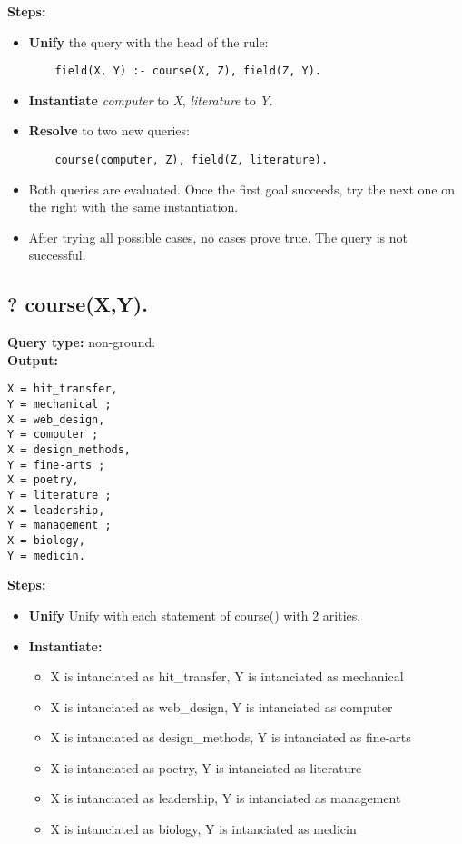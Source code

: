 \textbf{Steps:}
\begin{itemize}
    \item \textbf{Unify} the query with the head of the rule:
    \begin{lstlisting}
    field(X, Y) :- course(X, Z), field(Z, Y).
    \end{lstlisting}
\item \textbf{Instantiate} \textit{computer} to \textit{X}, \textit{literature} to \textit{Y}.
    \item \textbf{Resolve} to two new queries:
    \begin{lstlisting}
    course(computer, Z), field(Z, literature).
    \end{lstlisting}
\item Both queries are evaluated. Once the first goal succeeds, try the next one on the right with the same instantiation.
\item After trying all possible cases, no cases prove true. The query is not successful.
\end{itemize}


\subsection{? course(X,Y).}
\textbf{Query type: } non-ground. \\
\textbf{Output:}
\begin{lstlisting}
X = hit_transfer, 
Y = mechanical ; 
X = web_design, 
Y = computer ; 
X = design_methods, 
Y = fine-arts ; 
X = poetry, 
Y = literature ; 
X = leadership, 
Y = management ; 
X = biology, 
Y = medicin. 
\end{lstlisting}

\textbf{Steps:}
\begin{itemize}
    \item \textbf{Unify} Unify with each statement of course() with 2 arities.
    \item \textbf{Instantiate: } 
    \begin{itemize}
        \item X is intanciated as hit\_transfer, Y is intanciated as mechanical
        \item X is intanciated as web\_design, Y is intanciated as computer
        \item X is intanciated as design\_methods, Y is intanciated as fine-arts
        \item X is intanciated as poetry, Y is intanciated as literature
        \item X is intanciated as leadership, Y is intanciated as management
        \item X is intanciated as biology, Y is intanciated as medicin
    \end{itemize}
\end{itemize}



